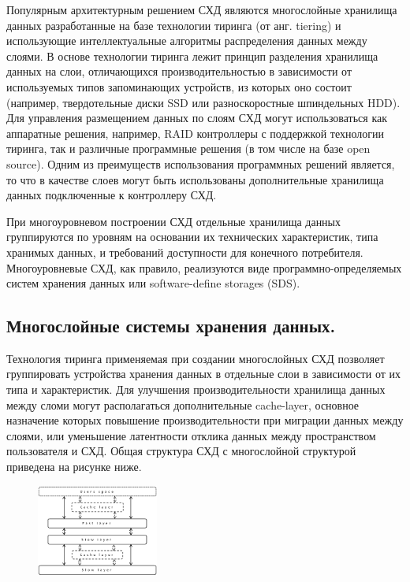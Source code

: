 \documentclass[10pt, a5paper]{article}
\begin{document}
Популярным архитектурным решением СХД являются многослойные хранилища данных разработанные на базе технологии  тиринга (от анг. tiering) и использующие интеллектуальные алгоритмы распределения данных между слоями. В основе технологии тиринга лежит принцип разделения хранилища данных на слои, отличающихся производительностью в зависимости от используемых типов запоминающих устройств, из которых оно состоит (например, твердотельные диски SSD или разноскоростные шпиндельных HDD). Для управления размещением данных по слоям СХД могут использоваться как аппаратные решения, например, RAID контроллеры с поддержкой технологии тиринга, так и различные  программные решения (в том числе на базе open source). Одним из преимуществ использования программных решений является, то что в качестве слоев могут быть использованы дополнительные хранилища данных подключенные к контроллеру СХД.

При многоуровневом построении СХД отдельные хранилища данных группируются по уровням на основании их технических характеристик, типа хранимых данных, и требований доступности для конечного потребителя. Многоуровневые СХД, как правило, реализуются виде программно-определяемых систем хранения данных или software-define storages (SDS).

\subsection*{Многослойные  системы хранения данных.}

Технология тиринга применяемая при создании многослойных СХД позволяет группировать устройства хранения данных в отдельные слои в зависимости от их типа и характеристик. Для улучшения производительности хранилища данных между сломи могут располагаться дополнительные cache-layer, основное назначение которых повышение производительности при миграции данных между слоями, или уменьшение латентности отклика данных между  пространством пользователя и СХД. Общая структура СХД  с многослойной структурой приведена на рисунке ниже.

\begin{center}

\begin{figure}[h!]
  \centering
  \includegraphics[width=4cm]{kliga1.jpg}
  
  \label{Kliga1}
\end{figure}

\end{center}
\end{document}
